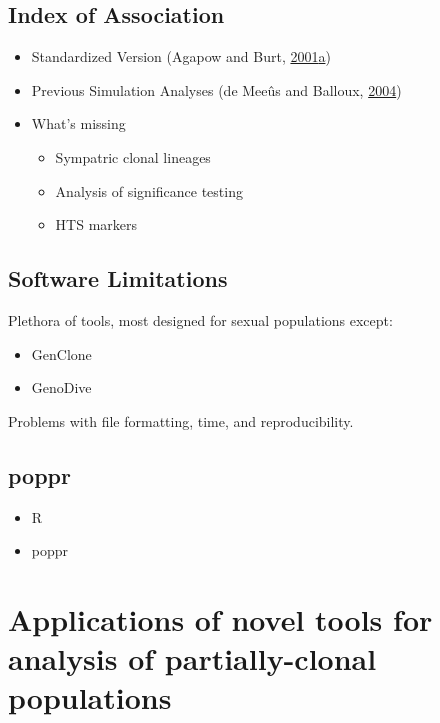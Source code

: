 \documentclass[double,12pt]{beavtex}
\providecommand{\tightlist}{%
  \setlength{\itemsep}{0pt}\setlength{\parskip}{0pt}}
\begin{document}
  \subsection{Index of Association}\label{index-of-association}
  
  \begin{itemize}
  \tightlist
  \item
    Standardized Version (Agapow and Burt,
    \protect\hyperlink{ref-Agapow_2001}{2001}\protect\hyperlink{ref-Agapow_2001}{a})
  \item
    Previous Simulation Analyses (de Meeûs and Balloux,
    \protect\hyperlink{ref-de2004clonal}{2004})
  \item
    What's missing
  
    \begin{itemize}
    \tightlist
    \item
      Sympatric clonal lineages
    \item
      Analysis of significance testing
    \item
      HTS markers
    \end{itemize}
  \end{itemize}
  
  \subsection{Software Limitations}\label{software-limitations}
  
  Plethora of tools, most designed for sexual populations except:
  
  \begin{itemize}
  \tightlist
  \item
    GenClone
  \item
    GenoDive
  \end{itemize}
  
  Problems with file formatting, time, and reproducibility.
  
  \subsection{poppr}\label{poppr}
  
  \begin{itemize}
  \tightlist
  \item
    R
  \item
    poppr
  \end{itemize}
  
  \section{Applications of novel tools for analysis of partially-clonal
  populations}\label{applications-of-novel-tools-for-analysis-of-partially-clonal-populations}
  
\end{document}
